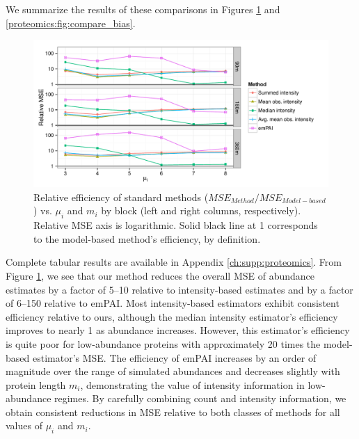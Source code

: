 We summarize the results of these comparisons in Figures \ref{proteomics:fig:compare_relative_error} and \ref{proteomics:fig:compare_bias}.
%
\begin{figure}
\centering
\includegraphics[width=\textwidth, page=3]{figures/proteomics/figures_relative_error_sim}
\caption{Relative efficiency of standard methods ($MSE_{Method} / MSE_{Model-based}$) vs. $\mu_i$ and $m_i$ by block (left and right columns, respectively). Relative MSE axis is logarithmic. Solid black line at 1 corresponds to the model-based method's efficiency, by definition.
\label{proteomics:fig:compare_relative_error}}
\end{figure}
%
Complete tabular results are available in Appendix \ref{ch:supp:proteomics}.
From Figure \ref{proteomics:fig:compare_relative_error}, we see that our method reduces the overall MSE of abundance estimates by a factor of 5--10 relative to intensity-based estimates and by a factor of 6--150 relative to emPAI.
Most intensity-based estimators exhibit consistent efficiency relative to ours, although the median intensity estimator's efficiency improves to nearly 1 as abundance increases.
However, this estimator's efficiency is quite poor for low-abundance proteins with approximately 20 times the model-based estimator's MSE.
The efficiency of emPAI increases by an order of magnitude over the range of simulated abundances and decreases slightly with protein length $m_i$, demonstrating the value of intensity information in low-abundance regimes.
By carefully combining count and intensity information, we obtain consistent reductions in MSE relative to both classes of methods for all values of $\mu_i$ and $m_i$.

